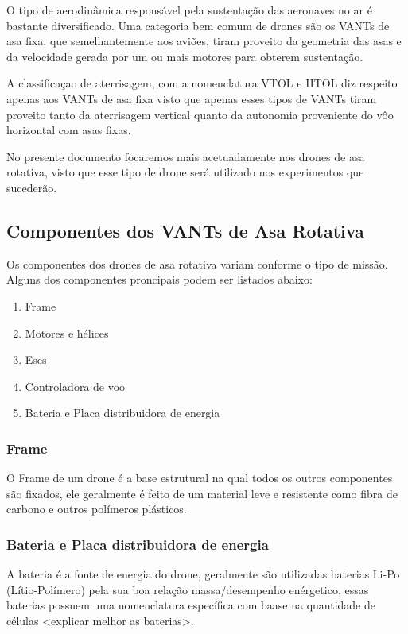 \documentclass[12pt,a4paper,oneside]{book}
\begin{document}
O tipo de aerodinâmica responsável pela sustentação das aeronaves no ar é bastante diversificado. Uma categoria bem comum de drones são os VANTs de asa fixa, que semelhantemente aos aviões, tiram proveito da geometria das asas e da velocidade gerada por um ou mais motores para obterem sustentação. 

A classificaçao de aterrisagem, com a nomenclatura VTOL e HTOL diz respeito apenas aos VANTs de asa fixa visto que apenas esses tipos de VANTs tiram proveito tanto da aterrisagem vertical quanto da autonomia proveniente do vôo horizontal com asas fixas. 

No presente documento focaremos mais acetuadamente nos drones de asa rotativa, visto que esse tipo de drone será utilizado nos experimentos que sucederão.

\subsection{Componentes dos VANTs de Asa Rotativa}

Os componentes dos drones de asa rotativa variam conforme o tipo de missão. Alguns dos componentes proncipais podem ser listados abaixo:

\begin{enumerate}
  \item Frame
  \item Motores e hélices
  \item Escs
  \item Controladora de voo
  \item Bateria e Placa distribuidora de energia
\end{enumerate}
\subsubsection*{Frame}

O Frame de um drone é a base estrutural na qual todos os outros componentes são fixados, ele geralmente é feito de um material leve e 
resistente como fibra de carbono e outros polímeros plásticos. 

\subsubsection*{Bateria e Placa distribuidora de energia}

A bateria é a fonte de energia do drone, geralmente são utilizadas baterias Li-Po (Lítio-Polímero) pela sua boa relação massa/desempenho 
enérgetico, essas baterias possuem uma nomenclatura específica com baase na quantidade de células <explicar melhor as baterias>.
\end{document}
